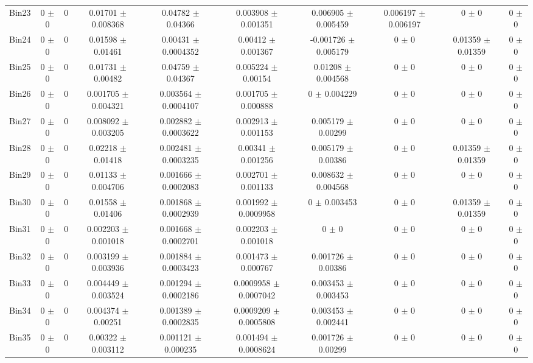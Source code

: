 \begin{tabular}{@{\extracolsep{4pt}}lccccccccc@{}}
     Bin23 & 0 $\pm$ 0 & 0 & 0.01701 $\pm$ 0.008368 & 0.04782 $\pm$ 0.04366 & 0.003908 $\pm$ 0.001351 & 0.006905 $\pm$ 0.005459 & 0.006197 $\pm$ 0.006197 & 0 $\pm$ 0 & 0 $\pm$ 0 \\ 
     Bin24 & 0 $\pm$ 0 & 0 & 0.01598 $\pm$ 0.01461 & 0.00431 $\pm$ 0.0004352 & 0.00412 $\pm$ 0.001367 & -0.001726 $\pm$ 0.005179 & 0 $\pm$ 0 & 0.01359 $\pm$ 0.01359 & 0 $\pm$ 0 \\ 
     Bin25 & 0 $\pm$ 0 & 0 & 0.01731 $\pm$ 0.00482 & 0.04759 $\pm$ 0.04367 & 0.005224 $\pm$ 0.00154 & 0.01208 $\pm$ 0.004568 & 0 $\pm$ 0 & 0 $\pm$ 0 & 0 $\pm$ 0 \\ 
     Bin26 & 0 $\pm$ 0 & 0 & 0.001705 $\pm$ 0.004321 & 0.003564 $\pm$ 0.0004107 & 0.001705 $\pm$ 0.000888 & 0 $\pm$ 0.004229 & 0 $\pm$ 0 & 0 $\pm$ 0 & 0 $\pm$ 0 \\ 
     Bin27 & 0 $\pm$ 0 & 0 & 0.008092 $\pm$ 0.003205 & 0.002882 $\pm$ 0.0003622 & 0.002913 $\pm$ 0.001153 & 0.005179 $\pm$ 0.00299 & 0 $\pm$ 0 & 0 $\pm$ 0 & 0 $\pm$ 0 \\ 
     Bin28 & 0 $\pm$ 0 & 0 & 0.02218 $\pm$ 0.01418 & 0.002481 $\pm$ 0.0003235 & 0.00341 $\pm$ 0.001256 & 0.005179 $\pm$ 0.00386 & 0 $\pm$ 0 & 0.01359 $\pm$ 0.01359 & 0 $\pm$ 0 \\ 
     Bin29 & 0 $\pm$ 0 & 0 & 0.01133 $\pm$ 0.004706 & 0.001666 $\pm$ 0.0002083 & 0.002701 $\pm$ 0.001133 & 0.008632 $\pm$ 0.004568 & 0 $\pm$ 0 & 0 $\pm$ 0 & 0 $\pm$ 0 \\ 
     Bin30 & 0 $\pm$ 0 & 0 & 0.01558 $\pm$ 0.01406 & 0.001868 $\pm$ 0.0002939 & 0.001992 $\pm$ 0.0009958 & 0 $\pm$ 0.003453 & 0 $\pm$ 0 & 0.01359 $\pm$ 0.01359 & 0 $\pm$ 0 \\ 
     Bin31 & 0 $\pm$ 0 & 0 & 0.002203 $\pm$ 0.001018 & 0.001668 $\pm$ 0.0002701 & 0.002203 $\pm$ 0.001018 & 0 $\pm$ 0 & 0 $\pm$ 0 & 0 $\pm$ 0 & 0 $\pm$ 0 \\ 
     Bin32 & 0 $\pm$ 0 & 0 & 0.003199 $\pm$ 0.003936 & 0.001884 $\pm$ 0.0003423 & 0.001473 $\pm$ 0.000767 & 0.001726 $\pm$ 0.00386 & 0 $\pm$ 0 & 0 $\pm$ 0 & 0 $\pm$ 0 \\ 
     Bin33 & 0 $\pm$ 0 & 0 & 0.004449 $\pm$ 0.003524 & 0.001294 $\pm$ 0.0002186 & 0.0009958 $\pm$ 0.0007042 & 0.003453 $\pm$ 0.003453 & 0 $\pm$ 0 & 0 $\pm$ 0 & 0 $\pm$ 0 \\ 
     Bin34 & 0 $\pm$ 0 & 0 & 0.004374 $\pm$ 0.00251 & 0.001389 $\pm$ 0.0002835 & 0.0009209 $\pm$ 0.0005808 & 0.003453 $\pm$ 0.002441 & 0 $\pm$ 0 & 0 $\pm$ 0 & 0 $\pm$ 0 \\ 
     Bin35 & 0 $\pm$ 0 & 0 & 0.00322 $\pm$ 0.003112 & 0.001121 $\pm$ 0.000235 & 0.001494 $\pm$ 0.0008624 & 0.001726 $\pm$ 0.00299 & 0 $\pm$ 0 & 0 $\pm$ 0 & 0 $\pm$ 0 \\ 

\end{tabular}
